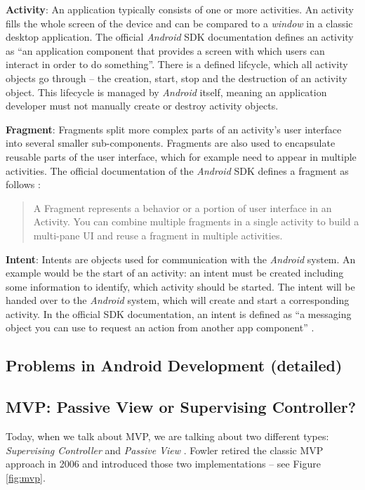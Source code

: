 \textbf{Activity}: An application typically consists of one or more activities. An activity fills the whole screen of the device and can be compared to a \emph{window} in a classic desktop application. The official \emph{Android} SDK documentation \cite{SDKActivities} defines an activity as \enquote{an application component that provides a screen with which users can interact in order to do something}.
There is a defined lifcycle, which all activity objects go through -- the creation, start, stop and the destruction of an activity object. This lifecycle is managed by \emph{Android} itself, meaning an application developer must not manually create or destroy activity objects.

\textbf{Fragment}: Fragments split more complex parts of an activity's user interface into several smaller sub-components. Fragments are also used to encapsulate reusable parts of the user interface, which for example need to appear in multiple activities. The official documentation of the \emph{Android} SDK defines a fragment as follows \cite{SDKFragments}:

\begin{quote}
A Fragment represents a behavior or a portion of user interface in an Activity. You can combine multiple fragments in a single activity to build a multi-pane UI and reuse a fragment in multiple activities.
\end{quote}

\textbf{Intent}: Intents are objects used for communication with the \emph{Android} system. An example would be the start of an activity: an intent must be created including some information to identify, which activity should be started. The intent will be handed over to the \emph{Android} system, which will create and start a corresponding activity. In the official SDK documentation, an intent is defined as \enquote{a messaging object you can use to request an action from another app component} \cite{SDKIntents}.

\subsection{Problems in Android Development (detailed)}

\subsection{MVP: Passive View or Supervising Controller?}

Today, when we talk about MVP, we are talking about two different types: \emph{Supervising Controller} \cite{FowlerSupervisingController} and \emph{Passive View} \cite{FowlerPassiveView}. Fowler retired the classic MVP approach in 2006 \cite{FowlerMvpRetirementNote} and introduced those two implementations -- see Figure \ref{fig:mvp}.

